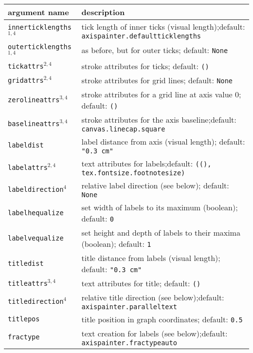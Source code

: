 \medskip
\begin{tabularx}{\linewidth}{l>{\raggedright\arraybackslash}X}
argument name&description\\
\hline
\texttt{innerticklengths}$^{1,4}$&tick length of inner ticks (visual length);\newline default: \texttt{axispainter.defaultticklengths}\\
\texttt{outerticklengths}$^{1,4}$&as before, but for outer ticks; default: \texttt{None}\\
\texttt{tickattrs}$^{2,4}$&stroke attributes for ticks; default: \texttt{()}\\
\texttt{gridattrs}$^{2,4}$&stroke attributes for grid lines; default: \texttt{None}\\
\texttt{zerolineattrs}$^{3,4}$&stroke attributes for a grid line at axis value 0; default: \texttt{()}\\
\texttt{baselineattrs}$^{3,4}$&stroke attributes for the axis baseline;\newline default: \texttt{canvas.linecap.square}\\
\texttt{labeldist}&label distance from axis (visual length); default: \texttt{"0.3 cm"}\\
\texttt{labelattrs}$^{2,4}$&text attributes for labels;\newline default: \texttt{((), tex.fontsize.footnotesize)}\\
\texttt{labeldirection}$^4$&relative label direction (see below); default: \texttt{None}\\
\texttt{labelhequalize}&set width of labels to its maximum (boolean); default: \texttt{0}\\
\texttt{labelvequalize}&set height and depth of labels to their maxima (boolean); default: \texttt{1}\\
\texttt{titledist}&title distance from labels (visual length); default: \texttt{"0.3 cm"}\\
\texttt{titleattrs}$^{3,4}$&text attributes for title; default: \texttt{()}\\
\texttt{titledirection}$^4$&relative title direction (see below);\newline default: \texttt{axispainter.paralleltext}\\
\texttt{titlepos}&title position in graph coordinates; default: \texttt{0.5}\\
\texttt{fractype}&text creation for labels (see below);\newline default: \texttt{axispainter.fractypeauto}\\

\end{tabularx}
